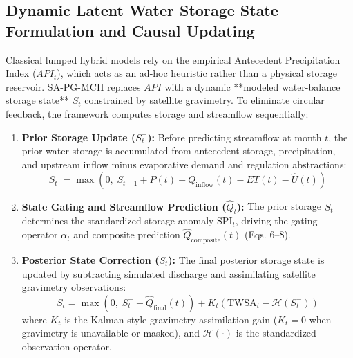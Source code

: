 \documentclass[11pt,a4paper,fleqn]{article}
\begin{document}
\subsection{Dynamic Latent Water Storage State Formulation and Causal Updating}

Classical lumped hybrid models rely on the empirical Antecedent Precipitation Index ($API_t$), which acts as an ad-hoc heuristic rather than a physical storage reservoir. SA-PG-MCH replaces $API$ with a dynamic **modeled water-balance storage state** $S_t$ constrained by satellite gravimetry. To eliminate circular feedback, the framework computes storage and streamflow sequentially:

\begin{enumerate}
    \item \textbf{Prior Storage Update ($S_t^-$):} Before predicting streamflow at month $t$, the prior water storage is accumulated from antecedent storage, precipitation, and upstream inflow minus evaporative demand and regulation abstractions:
    \begin{equation}
    S_t^- = \max\left(0, \; S_{t-1} + P(t) + Q_{\text{inflow}}(t) - ET(t) - \hat{U}(t)\right)
    \end{equation}
    \item \textbf{State Gating and Streamflow Prediction ($\hat{Q}_t$):} The prior storage $S_t^-$ determines the standardized storage anomaly $\text{SPI}_t$, driving the gating operator $\alpha_t$ and composite prediction $\hat{Q}_{\text{composite}}(t)$ (Eqs. 6--8).
    \item \textbf{Posterior State Correction ($S_t$):} The final posterior storage state is updated by subtracting simulated discharge and assimilating satellite gravimetry observations:
    \begin{equation}
    S_t = \max\left(0, \; S_t^- - \hat{Q}_{\text{final}}(t)\right) + K_t \left(\text{TWSA}_t - \mathcal{H}(S_t^-)\right)
    \end{equation}
    where $K_t$ is the Kalman-style gravimetry assimilation gain ($K_t = 0$ when gravimetry is unavailable or masked), and $\mathcal{H}(\cdot)$ is the standardized observation operator.
\end{enumerate}
\end{document}
